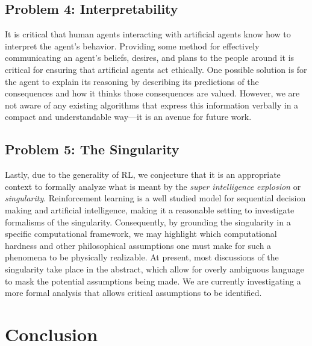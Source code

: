 \documentclass[11pt]{article}
\begin{document}
\subsection{Problem 4: Interpretability} It is critical that human agents interacting with artificial agents know how to interpret the agent's behavior. Providing some method for effectively communicating an agent's beliefs, desires, and plans to the people around it is critical for ensuring that artificial agents act ethically. One possible solution is for the agent to explain its reasoning by describing its predictions of the consequences and how it thinks those consequences are valued. However, we are not aware of any existing algorithms that express this information verbally in a compact and understandable way---it is an avenue for future work.

\subsection{Problem 5: The Singularity} Lastly, due to the generality of RL, we conjecture that it is an appropriate context to formally analyze what is meant by the {\it super intelligence explosion} or {\it singularity}. Reinforcement learning is a well studied model for sequential decision making and artificial intelligence, making it a reasonable setting to investigate formalisms of the singularity. Consequently, by grounding the singularity in a specific computational framework, we may highlight which computational hardness and other philosophical assumptions one must make for such a phenomena to be physically realizable. At present, most discussions of the singularity take place in the abstract, which allow for overly ambiguous language to mask the potential assumptions being made. We are currently investigating a more formal analysis that allows critical assumptions to be identified.


\section{Conclusion}
\end{document}
